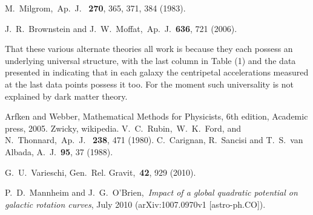 \begin{thebibliography}{10}
 M.~Milgrom,~Ap.~J.~ {\bf 270}, 365, 371, 384 (1983).

 J.~R.~Brownstein and  J.~W.~Moffat,~Ap.~J.~{\bf 636}, 721 (2006).

  That these various alternate theories all work is because they each possess an underlying universal structure, with the last column in Table (1) and the data presented in
\cite{Mannheim2010b1} indicating that in each galaxy the centripetal accelerations measured at the last data points possess it too. For the moment such universality is not explained by dark matter theory.




 Arfken and Webber, Mathematical Methods for Physicists, 6th edition, Academic press, 2005.
 Zwicky, wikipedia.
 V.~C.~Rubin,~W.~K.~Ford, and N.~Thonnard,~Ap.~J.~ {\bf 238},  471 (1980).
 C.~Carignan, R.~Sancisi and  T.~S.~van Albada, A.~J.~{\bf 95}, 37 (1988).











 G.~U.~Varieschi, Gen.~Rel. Gravit,~{\bf 42}, 929 (2010).



 P.~D.~Mannheim and J.~G.~O'Brien,~{\it Impact of a global quadratic potential on galactic rotation curves}, July 2010 (arXiv:1007.0970v1  [astro-ph.CO]). 


\end{thebibliography}
